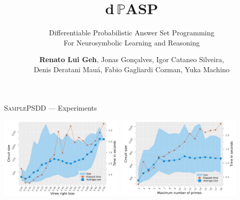 \documentclass[aspectratio=169]{beamer}
\newcommand{\dpasp}{\textbf{\textcolor{palette-purple}{$\bm{d}$}\,\textcolor{palette-orange}{$\pmb{\mathbb{P}}$}\textcolor{palette-green}{A}\textcolor{palette-blue}{S}\textcolor{palette-yellow}{P}}}
\newcommand{\ccimg}{%
  \hspace{0.25cm}\def\svgwidth{0.1\textwidth}%
}
\def\pagenumbering{}
\begin{document}
\begin{frame}[fragile]{\textsc{SamplePSDD} --- Experiments}
\begin{center}
{    \includegraphics[width=0.45\textwidth]{figures/vtree_complexity.pdf}
    \includegraphics[width=0.45\textwidth]{figures/k_complexity.pdf}
  }
\end{center}

\end{frame}


\author{\small\textbf{Renato Lui Geh}, Jonas Gonçalves, Igor Cataneo Silveira,\texorpdfstring{\\}{
}Denis Deratani Mauá, Fabio Gagliardi Cozman, Yuka Machino}
\subtitle{\texorpdfstring{\normalsize\color{black}\itshape}{}\textcolor{palette-blue}{D}ifferentiable \textcolor{palette-blue}{P}robabilistic \textcolor{palette-blue}{A}nswer \textcolor{palette-blue}{S}et \textcolor{palette-blue}{P}rogramming\\For Neurosymbolic Learning and Reasoning}
\title{\rmfamily\bfseries\Huge\dpasp}


\let\pagenumbering\undefined
\begin{frame}
    \titlepage
    \ccimg
\end{frame}
\def\pagenumbering{}

\end{document}
